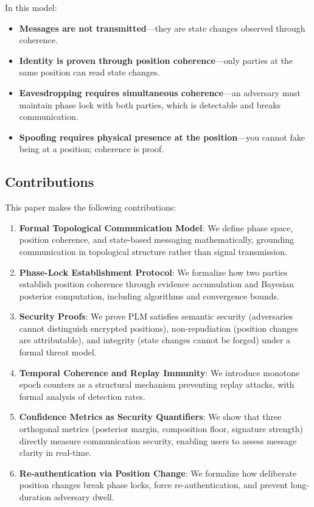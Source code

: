 \documentclass[11pt,a4paper]{article}
\theoremstyle{definition}
\begin{document}
In this model:
\begin{itemize}
\item \textbf{Messages are not transmitted}—they are state changes observed through coherence.
\item \textbf{Identity is proven through position coherence}—only parties at the same position can read state changes.
\item \textbf{Eavesdropping requires simultaneous coherence}—an adversary must maintain phase lock with both parties, which is detectable and breaks communication.
\item \textbf{Spoofing requires physical presence at the position}—you cannot fake being at a position; coherence is proof.
\end{itemize}

\subsection{Contributions}

This paper makes the following contributions:

\begin{enumerate}
\item \textbf{Formal Topological Communication Model}: We define phase space, position coherence, and state-based messaging mathematically, grounding communication in topological structure rather than signal transmission.

\item \textbf{Phase-Lock Establishment Protocol}: We formalize how two parties establish position coherence through evidence accumulation and Bayesian posterior computation, including algorithms and convergence bounds.

\item \textbf{Security Proofs}: We prove PLM satisfies semantic security (adversaries cannot distinguish encrypted positions), non-repudiation (position changes are attributable), and integrity (state changes cannot be forged) under a formal threat model.

\item \textbf{Temporal Coherence and Replay Immunity}: We introduce monotone epoch counters as a structural mechanism preventing replay attacks, with formal analysis of detection rates.

\item \textbf{Confidence Metrics as Security Quantifiers}: We show that three orthogonal metrics (posterior margin, composition floor, signature strength) directly measure communication security, enabling users to assess message clarity in real-time.

\item \textbf{Re-authentication via Position Change}: We formalize how deliberate position changes break phase locks, force re-authentication, and prevent long-duration adversary dwell.

\end{enumerate}
\end{document}
